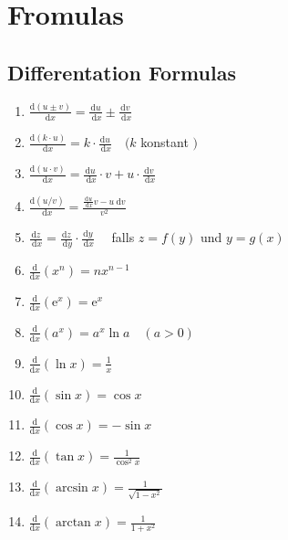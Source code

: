 \section{Fromulas}
\subsection{Differentation Formulas}
\begin{multicols}{2}
[]
 \begin{enumerate}
     \item $\frac{\mathrm{d}(u \pm v)}{\mathrm{d} x}=\frac{\mathrm{d} u}{\mathrm{~d} x} \pm \frac{\mathrm{d} v}{\mathrm{~d} x}$
    \item $\frac{\mathrm{d}(k \cdot u)}{\mathrm{d} x}=k \cdot \frac{\mathrm{d} u}{\mathrm{~d} x} \quad(k$ konstant $)$
    \item $\frac{\mathrm{d}(u \cdot v)}{\mathrm{d} x}=\frac{\mathrm{d} u}{\mathrm{~d} x} \cdot v+u \cdot \frac{\mathrm{d} v}{\mathrm{~d} x}$
    \item $\frac{\mathrm{d}(u / v)}{\mathrm{d} x}=\frac{\frac{\mathrm{d} u}{\mathrm{~d} x} v-u \mathrm{~d} v}{v^{2}}$
    \item $\frac{\mathrm{d} z}{\mathrm{~d} x}=\frac{\mathrm{d} z}{\mathrm{~d} y} \cdot \frac{\mathrm{d} y}{\mathrm{~d} x} \quad$ falls $z=f(y)$ und $y=g(x)$
    \item $\frac{\mathrm{d}}{\mathrm{d} x}\left(x^{n}\right)=n x^{n-1}$
    \item $\frac{\mathrm{d}}{\mathrm{d} x}\left(\mathrm{e}^{x}\right)=\mathrm{e}^{x}$
    \item $\frac{\mathrm{d}}{\mathrm{d} x}\left(a^{x}\right)=a^{x} \ln a \quad(a>0)$
    \item $\frac{\mathrm{d}}{\mathrm{d} x}(\ln x)=\frac{1}{x}$
    \item $\frac{\mathrm{d}}{\mathrm{d} x}(\sin x)=\cos x$
    \item $\frac{\mathrm{d}}{\mathrm{d} x}(\cos x)=-\sin x$
    \item $\frac{\mathrm{d}}{\mathrm{d} x}(\tan x)=\frac{1}{\cos ^{2} x}$
    \item $\frac{\mathrm{d}}{\mathrm{d} x}(\arcsin x)=\frac{1}{\sqrt{1-x^{2}}}$
    \item $\frac{\mathrm{d}}{\mathrm{d} x}(\arctan x)=\frac{1}{1+x^{2}}$
 \end{enumerate}
\end{multicols}
